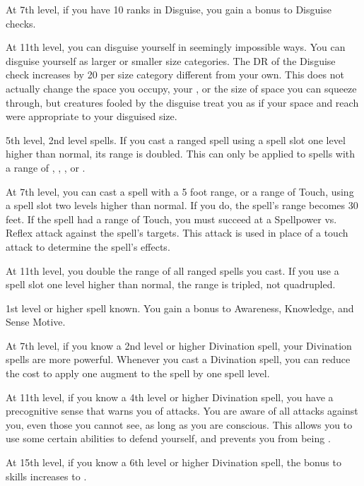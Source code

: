     At 7th level, if you have 10 ranks in Disguise, you gain a  bonus to Disguise checks.

    At 11th level, you can disguise yourself in seemingly impossible ways.
    You can disguise yourself as larger or smaller size categories.
    The DR of the Disguise check increases by 20 per size category different from your own.
    This does not actually change the space you occupy, your , or the size of space you can squeeze through, but creatures fooled by the disguise treat you as if your space and reach were appropriate to your disguised size.

    \featpre 5th level, 2nd level spells.
    \featben If you cast a ranged spell using a spell slot one level higher than normal, its range is doubled.
    This can only be applied to spells with a range of \rngclose, \rngmed, \rnglong, or \rngext.

    At 7th level, you can cast a spell with a 5 foot range, or a range of Touch, using a spell slot two levels higher than normal.
    If you do, the spell's range becomes 30 feet.
    If the spell had a range of Touch, you must succeed at a Spellpower vs. Reflex attack against the spell's targets.
    This attack is used in place of a touch attack to determine the spell's effects.

    At 11th level, you double the range of all ranged spells you cast.
    If you use a spell slot one level higher than normal, the range is tripled, not quadrupled.

    \featpre 1st level or higher  spell known.
    \featben You gain a  bonus to Awareness, Knowledge, and Sense Motive.

    At 7th level, if you know a 2nd level or higher Divination spell, your Divination spells are more powerful.
    Whenever you cast a Divination spell, you can reduce the cost to apply one augment to the spell by one spell level.

    At 11th level, if you know a 4th level or higher Divination spell, you have a precognitive sense that warns you of attacks.
    You are aware of all attacks against you, even those you cannot see, as long as you are conscious.
    This allows you to use some certain abilities to defend yourself, and prevents you from being \unaware.

    At 15th level, if you know a 6th level or higher Divination spell, the bonus to skills increases to .

